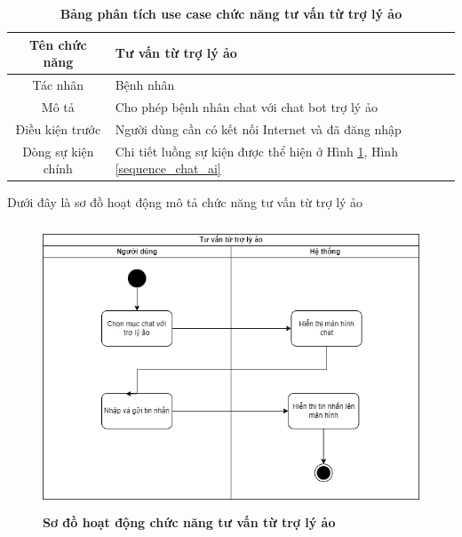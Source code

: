   \begin{table}[H]
    \caption{\bfseries \fontsize{12pt}{0pt}\selectfont Bảng phân tích use case chức năng tư vấn từ trợ lý ảo}
    \centering
    \begin{tabularx}{0.9\textwidth}{|c|X|}
      \hline
      \textbf{Tên chức năng} & \textbf{Tư vấn từ trợ lý ảo} \\
      \hline
      Tác nhân & Bệnh nhân \\
      \hline
      Mô tả & Cho phép bệnh nhân chat với chat bot trợ lý ảo \\
      \hline
      Điều kiện trước & Người dùng cần có kết nối Internet và đã đăng nhập \\
      \hline
      Dòng sự kiện chính & 
        Chi tiết luồng sự kiện được thể hiện ở Hình \ref{activity_chat_ai}, Hình \ref{sequence_chat_ai} 
        \\
      \hline
    \end{tabularx}
  \end{table}  
  Dưới đây là sơ đồ hoạt động mô tả chức năng tư vấn từ trợ lý ảo
  \begin{figure}[H]
    \centering
    \includegraphics[width=11.5cm,height=8.5cm]{Images/activity/activity_chat_ai.png}
    \caption[Sơ đồ hoạt động chức năng tư vấn từ trợ lý ảo]{\bfseries \fontsize{12pt}{0pt}
    \selectfont Sơ đồ hoạt động chức năng tư vấn từ trợ lý ảo}
    \label{activity_chat_ai} %
  \end{figure}

